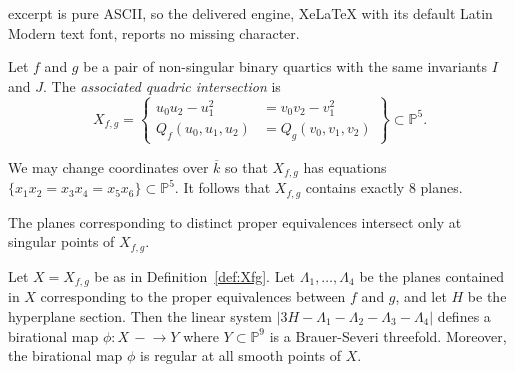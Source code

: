 \documentclass[10pt,a4paper]{amsart}
\newcommand{\PP}{{\mathbb P}}
\newcommand{\kbar}{{\overline k}}
\begin{document}
excerpt is pure ASCII, so the delivered engine, XeLaTeX with its default Latin Modern text font, reports no missing character.
\begin{Definition}
  \label{def:Xfg}
  Let $f$ and $g$ be a pair of non-singular binary quartics with
  the same invariants $I$ and $J$. The {\em associated quadric
  intersection} is 
\[ X_{f,g} = \left\{ \begin{aligned} u_0 u_2 - u_1^2 &= v_0 v_2 - v_1^2 \\
Q_f(u_0,u_1,u_2) &= Q_g(v_0,v_1,v_2) \end{aligned} \right\} \subset \PP^5. \]
\end{Definition}

\begin{Remark}
\label{rem:8planes}
We may change coordinates over $\kbar$ so that $X_{f,g}$ has equations
$\{ x_1 x_2 = x_3 x_4 = x_5 x_6 \} \subset \PP^5$.  It follows that
$X_{f,g}$ contains exactly $8$ planes.
\end{Remark}  

\begin{Lemma}
\label{lem:2planes}
  The planes corresponding to distinct proper
  equivalences intersect only at singular points of $X_{f,g}$.
\end{Lemma}

\begin{Proposition}
  \label{prop:bs}
  Let $X = X_{f,g}$ be as in Definition~\ref{def:Xfg}. Let
  $\Lambda_1, \ldots, \Lambda_4$ be the planes contained in $X$
  corresponding to the proper equivalences between $f$ and $g$, and
  let $H$ be the hyperplane section. Then the linear system
  $|3 H - \Lambda_1 - \Lambda_2 - \Lambda_3 - \Lambda_4|$ defines a
  birational map $\phi : X \, - \!  \to Y$ where $Y \subset \PP^9$ is
  a Brauer-Severi threefold. Moreover, the birational map $\phi$ is
  regular at all smooth points of $X$.
\end{Proposition}
\end{document}
